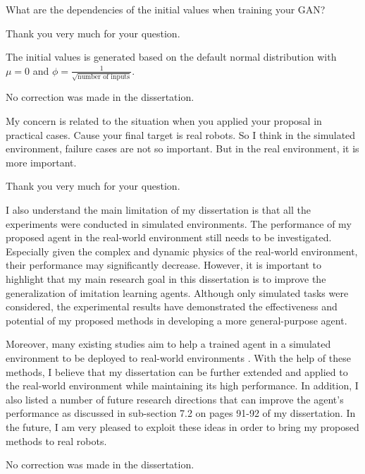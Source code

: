 
\begin{revcomment}
  What are the dependencies of the initial values
  when training your GAN?
\end{revcomment}

\begin{revresponse}
  Thank you very much for your question.

  The initial values is generated based on the default normal distribution with \(\mu = 0\) and
  \(\phi = \frac{1}{\sqrt{\text{number of inputs}}}\).

  \begin{correction}
    No correction was made in the dissertation.
  \end{correction}
\end{revresponse}


\begin{revcomment}
  My concern is related to the situation when you applied your proposal in practical cases.
  Cause your final target is real robots.
  So I think in the simulated environment, failure cases are not so important.
  But in the real environment, it is more important.
\end{revcomment}
\begin{revresponse}
  Thank you very much for your question.

  I also understand the main limitation of my dissertation is that all the experiments were conducted in simulated environments.
  The performance of my proposed agent in the real-world environment still needs to be investigated.
  Especially given the complex and dynamic physics of the real-world environment, their performance may significantly decrease.
  However, it is important to highlight that my main research goal in this dissertation is to improve the generalization of imitation learning agents.
  Although only simulated tasks were considered, the experimental results have demonstrated the effectiveness and potential of my proposed methods in developing a more general-purpose agent.

  Moreover, many existing studies aim to help a trained agent in a simulated environment to be deployed to real-world environments \cite{zhao2020sim,liu2022digital,qin2023dexpoint}.
  With the help of these methods,
  I believe that my dissertation can be further extended and applied to the real-world environment while maintaining its high performance.
  In addition,
  I also listed a number of future research directions that can improve the agent's performance as discussed in sub-section 7.2 on pages 91-92 of my dissertation.
  In the future, I am very pleased to exploit these ideas in order to bring my proposed methods to real robots.


  \begin{correction}
    No correction was made in the dissertation.
  \end{correction}
\end{revresponse}

